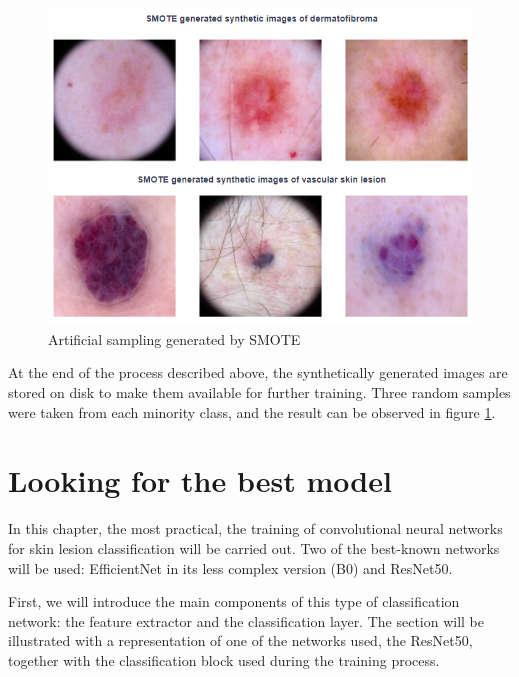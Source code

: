 \begin{figure} 
    \vspace{-40pt}
    \centering
        \includegraphics[scale=0.4]{images/Building/SMOTE/Artificial_new_images_generated_by_Smote.png}
        \caption{Artificial sampling generated by SMOTE }
    \label{fig: Artificial_sampling_generated_SMOTE}    
    \vspace{-100pt}
\end{figure}

\hspace{1cm}

At the end of the process described above, the synthetically generated images are stored on disk to make them available for further training. Three random samples were taken from each minority class, and the result can be observed in figure \ref{fig: Artificial_sampling_generated_SMOTE}.

\newpage
\section{Looking for the best model}

In this chapter, the most practical, the training of convolutional neural networks for skin lesion classification will be carried out. Two of the best-known networks will be used: EfficientNet in its less complex version (B0) and ResNet50.   

First, we will introduce the main components of this type of classification network: the feature extractor and the classification layer. The section will be illustrated with a representation of one of the networks used, the ResNet50, together with the classification block used during the training process. 

